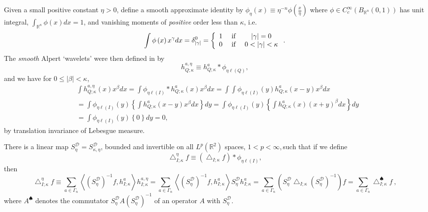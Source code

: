 \documentclass{amsart}%
\theoremstyle{plain}
\numberwithin{equation}{section}
\begin{document}
Given a small positive constant $\eta>0$, define a smooth approximate identity
by $\phi_{\eta}\left(  x\right)  \equiv\eta^{-n}\phi\left(  \frac{x}{\eta
}\right)  $ where $\phi\in C_{c}^{\infty}\left(  B_{\mathbb{R}^{n}}\left(
0,1\right)  \right)  $ has unit integral, $\int_{\mathbb{R}^{n}}\phi\left(
x\right)  dx=1$, and vanishing moments of \emph{positive} order less than
$\kappa$, i.e.
\begin{equation}
\int\phi\left(  x\right)  x^{\gamma}dx=\delta_{\left\vert \gamma\right\vert
}^{0}=\left\{
\begin{array}
[c]{ccc}%
1 & \text{ if } & \left\vert \gamma\right\vert =0\\
0 & \text{ if } & 0<\left\vert \gamma\right\vert <\kappa
\end{array}
\right.  .\label{van pos}%
\end{equation}
The \emph{smooth} Alpert `wavelets' were then defined in \cite{Saw7} by%
\[
h_{Q;\kappa}^{a,\eta}\equiv h_{Q;\kappa}^{a}\ast\phi_{\eta\ell\left(
Q\right)  },
\]
and we have for $0\leq\left\vert \beta\right\vert <\kappa$,%
\begin{align*}
& \int h_{Q;\kappa}^{a,\eta}\left(  x\right)  x^{\beta}dx=\int\phi_{\eta
\ell\left(  I\right)  }\ast h_{Q;\kappa}^{a}\left(  x\right)  x^{\beta}%
dx=\int\int\phi_{\eta\ell\left(  I\right)  }\left(  y\right)  h_{Q;\kappa}%
^{a}\left(  x-y\right)  x^{\beta}dx\\
& =\int\phi_{\eta\ell\left(  I\right)  }\left(  y\right)  \left\{  \int
h_{Q;\kappa}^{a}\left(  x-y\right)  x^{\beta}dx\right\}  dy=\int\phi_{\eta
\ell\left(  I\right)  }\left(  y\right)  \left\{  \int h_{Q;\kappa}^{a}\left(
x\right)  \left(  x+y\right)  ^{\beta}dx\right\}  dy\\
& =\int\phi_{\eta\ell\left(  I\right)  }\left(  y\right)  \left\{  0\right\}
dy=0,
\end{align*}
by translation invariance of Lebesgue measure.

There is a linear map $S_{\eta}^{\mathcal{D}}=S_{\kappa,\eta}^{\mathcal{D}}$,
bounded and invertible on all $L^{p}\left(  \mathbb{R}^{2}\right)  $ spaces,
$1<p<\infty$,$\,$such that if we define%
\[
\bigtriangleup_{I;\kappa}^{\eta}f\equiv\left(  \bigtriangleup_{I;\kappa
}f\right)  \ast\phi_{\eta\ell\left(  I\right)  },
\]
then%
\[
\bigtriangleup_{I;\kappa}^{\eta}f\equiv\sum_{a\in\Gamma_{n}}\left\langle
\left(  S_{\eta}^{\mathcal{D}}\right)  ^{-1}f,h_{I;\kappa}^{a}\right\rangle
h_{I;\kappa}^{a,\eta}=\sum_{a\in\Gamma_{n}}\left\langle \left(  S_{\eta
}^{\mathcal{D}}\right)  ^{-1}f,h_{I;\kappa}^{a}\right\rangle S_{\eta
}^{\mathcal{D}}h_{I;\kappa}^{a}=\sum_{a\in\Gamma_{n}}\left(  S_{\eta
}^{\mathcal{D}}\bigtriangleup_{I;\kappa}\left(  S_{\eta}^{\mathcal{D}}\right)
^{-1}\right)  f=\sum_{a\in\Gamma_{n}}\bigtriangleup_{I;\kappa}^{\spadesuit
}f\ ,
\]
where $A^{\spadesuit}$ denotes the commutator $S_{\eta}^{\mathcal{D}}A\left(
S_{\eta}^{\mathcal{D}}\right)  ^{-1}$ of an operator $A$ with $S_{\eta
}^{\mathcal{D}}$.
\end{document}
